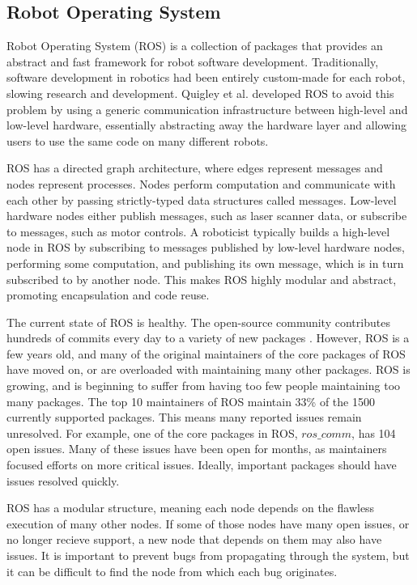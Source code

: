 \documentclass[letterpaper, 10 pt, conference]{ieeeconf}  %
\begin{document}
\subsection{Robot Operating System}
Robot Operating System (ROS) \cite{288} is a collection of packages that provides an abstract and fast framework for robot software development. Traditionally, software development in robotics had been entirely custom-made for each robot, slowing research and development. Quigley et al. \cite{288} developed ROS to avoid this problem by using a generic communication infrastructure between high-level and low-level hardware, essentially abstracting away the hardware layer and allowing users to use the same code on many different robots. 

ROS has a directed graph architecture, where edges represent messages and nodes represent processes. Nodes perform computation and communicate with each other by passing strictly-typed data structures called messages. Low-level hardware nodes either publish messages, such as laser scanner data, or subscribe to messages, such as motor controls. A roboticist typically builds a high-level node in ROS by subscribing to messages published by low-level hardware nodes, performing some computation, and publishing its own message, which is in turn subscribed to by another node. This makes ROS highly modular and abstract, promoting encapsulation and code reuse.

The current state of ROS is healthy. The open-source community contributes hundreds of commits every day to a variety of new packages \cite{ros-metrics}. However, ROS is a few years old, and many of the original maintainers of the core packages of ROS have moved on, or are overloaded with maintaining many other packages. ROS is growing, and is beginning to suffer from having too few people maintaining too many packages. The top 10 maintainers of ROS maintain 33\% of the 1500 currently supported packages. This means many reported issues remain unresolved. For example, one of the core packages in ROS, $ros\_comm$, has 104 open issues. Many of these issues have been open for months, as maintainers focused efforts on more critical issues. Ideally, important packages should have issues resolved quickly.

ROS has a modular structure, meaning each node depends on the flawless execution of many other nodes. If some of those nodes have many open issues, or no longer recieve support, a new node that depends on them may also have issues. It is important to prevent bugs from propagating through the system, but it can be difficult to find the node from which each bug originates. 
\end{document}
